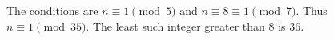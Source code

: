 The conditions are $n\equiv1\pmod5$ and $n\equiv8\equiv1\pmod7$. Thus $n\equiv1\pmod{35}$. The least such integer greater than $8$ is $\boxed{36}$.
